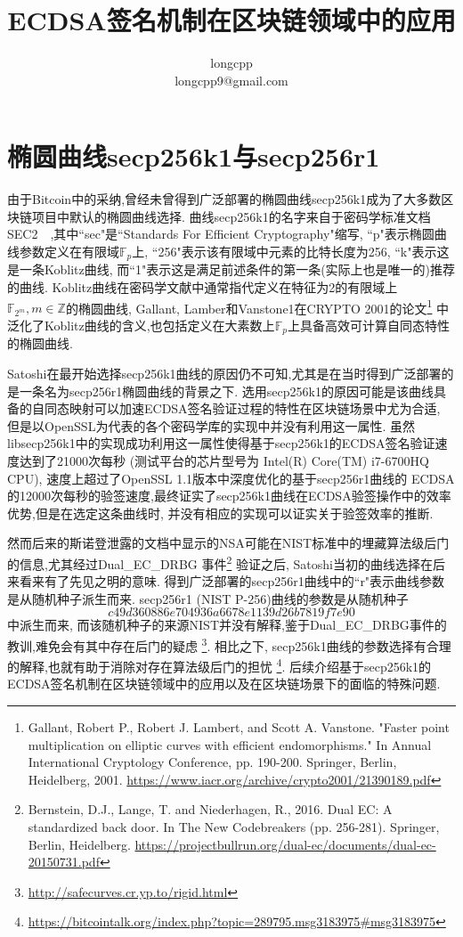 \documentclass{article}
\newcommand{\Z}{\mathbb{Z}}
\newcommand{\F}{\mathbb{F}}
\begin{document}
\title{ECDSA签名机制在区块链领域中的应用}
\author{longcpp \\ longcpp9@gmail.com}

\maketitle

\section{椭圆曲线secp256k1与secp256r1}

由于Bitcoin中的采纳,曾经未曾得到广泛部署的椭圆曲线secp256k1成为了大多数区块链项目中默认的椭圆曲线选择.
曲线secp256k1的名字来自于密码学标准文档SEC2~\cite{}~,其中``sec"是``Standards For Efficient Cryptography"缩写,
``p"表示椭圆曲线参数定义在有限域$\F_p$上, ``256"表示该有限域中元素的比特长度为256, 
``k"表示这是一条Koblitz曲线, 而``1"表示这是满足前述条件的第一条(实际上也是唯一的)推荐的曲线.
Koblitz曲线在密码学文献中通常指代定义在特征为2的有限域上$\F_{2^m}, m\in\Z$的椭圆曲线,
Gallant, Lamber和Vanstone1在CRYPTO 2001的论文\footnote{
Gallant, Robert P., Robert J. Lambert, and Scott A. Vanstone. "Faster point multiplication on elliptic curves with efficient endomorphisms." In Annual International Cryptology Conference, pp. 190-200. Springer, Berlin, Heidelberg, 2001.
\url{https://www.iacr.org/archive/crypto2001/21390189.pdf}}
中泛化了Koblitz曲线的含义,也包括定义在大素数上$\F_p$上具备高效可计算自同态特性的椭圆曲线.

Satoshi在最开始选择secp256k1曲线的原因仍不可知,尤其是在当时得到广泛部署的是一条名为secp256r1椭圆曲线的背景之下.
选用secp256k1的原因可能是该曲线具备的自同态映射可以加速ECDSA签名验证过程的特性在区块链场景中尤为合适,
但是以OpenSSL为代表的各个密码学库的实现中并没有利用这一属性.
虽然libsecp256k1中的实现成功利用这一属性使得基于secp256k1的ECDSA签名验证速度达到了21000次每秒
(测试平台的芯片型号为 Intel(R) Core(TM) i7-6700HQ CPU), 速度上超过了OpenSSL 1.1版本中深度优化的基于secp256r1曲线的
ECDSA的12000次每秒的验签速度,最终证实了secp256k1曲线在ECDSA验签操作中的效率优势,但是在选定这条曲线时,
并没有相应的实现可以证实关于验签效率的推断.

然而后来的斯诺登泄露的文档中显示的NSA可能在NIST标准中的埋藏算法级后门的信息,尤其经过Dual_EC_DRBG
事件\footnote{
Bernstein, D.J., Lange, T. and Niederhagen, R., 2016. Dual EC: A standardized back door. In The New Codebreakers (pp. 256-281). Springer, Berlin, Heidelberg.
\url{https://projectbullrun.org/dual-ec/documents/dual-ec-20150731.pdf}}
验证之后, Satoshi当初的曲线选择在后来看来有了先见之明的意味. 
得到广泛部署的secp256r1曲线中的``r"表示曲线参数是从随机种子派生而来. 
secp256r1 (NIST P-256)曲线的参数是从随机种子
$$c49d3608 86e70493 6a6678e1 139d26b7 819f7e90$$
中派生而来, 而该随机种子的来源NIST并没有解释,鉴于Dual_EC_DRBG事件的教训,难免会有其中存在后门的疑虑
\footnote{\url{http://safecurves.cr.yp.to/rigid.html}}.
相比之下, secp256k1曲线的参数选择有合理的解释,也就有助于消除对存在算法级后门的担忧
\footnote{\url{https://bitcointalk.org/index.php?topic=289795.msg3183975\#msg3183975}}.
后续介绍基于secp256k1的ECDSA签名机制在区块链领域中的应用以及在区块链场景下的面临的特殊问题.
\end{document}
